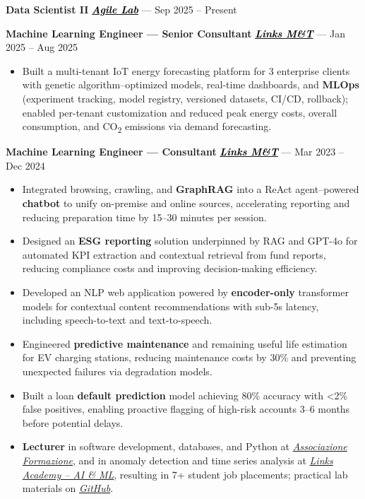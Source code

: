\documentclass[11pt,a4paper]{article}
\let\OldHref\href
\renewcommand{\href}[2]{\OldHref{#1}{\textit{#2}}}
\begin{document}
	{\small
		\textbf{Data Scientist II} \hfill \href{https://www.agilelab.it/}{\textbf{\textcolor{black}{Agile Lab}}} — Sep 2025 -- Present
		
		\textbf{Machine Learning Engineer — Senior Consultant} \hfill \href{https://www.linksmt.it/}{\textbf{\textcolor{black}{Links M\&T}}} — Jan 2025 -- Aug 2025
		\begin{itemize}
			\item Built a multi-tenant IoT energy forecasting platform for 3 enterprise clients with genetic algorithm–optimized models, real-time dashboards, and \textbf{MLOps} (experiment tracking, model registry, versioned datasets, CI/CD, rollback); enabled per-tenant customization and reduced peak energy costs, overall consumption, and CO\textsubscript{2} emissions via demand forecasting.
		\end{itemize}
		
		\textbf{Machine Learning Engineer — Consultant} \hfill \href{https://www.linksmt.it/}{\textbf{\textcolor{black}{Links M\&T}}} — Mar 2023 -- Dec 2024
		\begin{itemize}
			\item Integrated browsing, crawling, and \textbf{GraphRAG} into a ReAct agent–powered \textbf{chatbot} to unify on-premise and online sources, accelerating reporting and reducing preparation time by 15--30 minutes per session.
			\item Designed an \textbf{ESG reporting} solution underpinned by RAG and GPT-4o for automated KPI extraction and contextual retrieval from fund reports, reducing compliance costs and improving decision-making efficiency.
			\item Developed an NLP web application powered by \textbf{encoder-only} transformer models for contextual content recommendations with sub-5s latency, including speech-to-text and text-to-speech.
			\item Engineered \textbf{predictive maintenance} and remaining useful life estimation for EV charging stations, reducing maintenance costs by 30\% and preventing unexpected failures via degradation models.
			\item Built a loan \textbf{default prediction} model achieving 80\% accuracy with <2\% false positives, enabling proactive flagging of high-risk accounts 3--6 months before potential delays.
			\item \textbf{Lecturer} in software development, databases, and Python at \href{https://www.associazioneformazione.it/formazione-professionale/ifts-tecnico-per-la-progettazione-e-lo-sviluppo-di-applicazioni-informatiche}{\textit{Associazione Formazione}}, and in anomaly detection and time series analysis at \href{https://academy.linksmt.it/corso-di-formazione-post-laurea-artificial-intelligence-machine-learning/}{\textit{Links Academy – AI \& ML}}, resulting in 7+ student job placements; practical lab materials on \href{https://github.com/francesco-s/Links-Academy---Anomaly-Detection-Time-series-analysis}{\textit{GitHub}}.
		\end{itemize}
		
}
\end{document}
